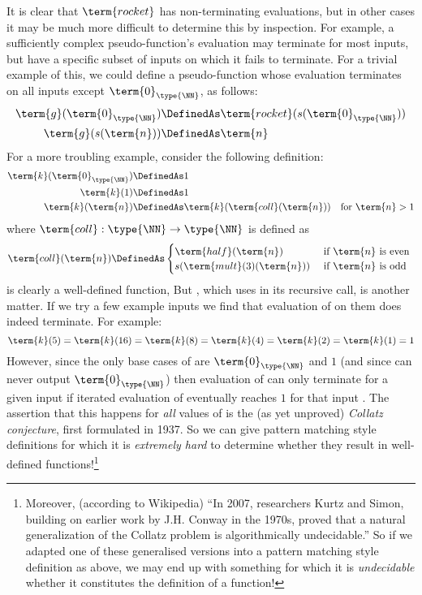 It is clear that $\term{rocket}$ has non-terminating evaluations, but in other cases it may be much more difficult to determine this by inspection.  For example, a sufficiently complex pseudo-function's evaluation may terminate for most inputs, but have a specific subset of inputs on which it fails to terminate.  For a trivial example of this, we could define a pseudo-function  
whose evaluation terminates on all inputs except $\term{0}_{\type{\NN}}$, as follows:
\begin{align*}
\term{g}(\term{0}_{\type{\NN}}) &\DefinedAs \term{rocket}(s(\term{0}_{\type{\NN}}))
\\
\term{g}(s(\term{n})) &\DefinedAs
\term{n}
\end{align*}
%
For a more troubling example, consider the following definition:
\begin{align*}
\term{k}(\term{0}_{\type{\NN}}) &\DefinedAs 
1
\\
\term{k}(1) &\DefinedAs 
1
\\
\term{k}(\term{n}) &\DefinedAs 
\term{k}(\term{coll}(\term{n}))	\quad \mbox{for } \term{n} > 1
\end{align*}
where $\term{coll}:\type{\NN} \to \type{\NN}$ is defined as
\[
\term{coll}(\term{n}) \DefinedAs 
\begin{cases}
\term{half}(\term{n}) & \mbox{ if } \term{n} \mbox{ is even }
\\
s(\term{mult}(3)(\term{n})) & \mbox{ if } \term{n} \mbox{ is odd }
\end{cases}
\]
 is clearly a well-defined function,  But , which uses  in its recursive call, is another matter.  If we try a few example inputs we find that evaluation of  on them does indeed terminate.  For example:
\[
\term{k}(5) 
= \term{k}(16)
= \term{k}(8)
= \term{k}(4)
= \term{k}(2)
= \term{k}(1)
= 1
\]  
However, since the only base cases of  are $\term{0}_{\type{\NN}}$ and $1$ (and since  can never output $\term{0}_{\type{\NN}}$) then evaluation of  can only terminate for a given input  if iterated evaluation of  eventually reaches $1$ for that input .  The assertion that this happens for \emph{all} values of  is the (as yet unproved) \emph{Collatz conjecture}, first formulated in 1937.  So we can give pattern matching style definitions for which it is \emph{extremely hard} to determine whether they result in well-defined functions!\footnote{
Moreover, (according to Wikipedia) ``In 2007, researchers Kurtz and Simon, building on earlier work by J.H. Conway in the 1970s, proved that a natural generalization of the Collatz problem is algorithmically undecidable.''  So if we adapted one of these generalised versions into a pattern matching style definition as above, we may end up with something for which it is \emph{undecidable} whether it constitutes the definition of a function!
}


